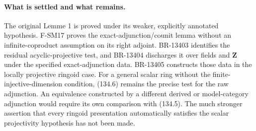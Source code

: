 \paragraph{What is settled and what remains.}
The original Lemme 1 is proved under its weaker, explicitly annotated
hypothesis.  F-SM17 proves the exact-adjunction/counit lemma without an
infinite-coproduct assumption on its right adjoint.  BR-13403 identifies
the residual acyclic-projective test, and BR-13404 discharges it over
fields and \(\mathbf Z\) under the specified exact-adjunction data.
BR-13405 constructs those data in the locally projective ringoid case.
For a general scalar ring without the finite-injective-dimension
condition, (134.6) remains the precise test for the raw adjunction.
An equivalence constructed by a different derived or model-category
adjunction would require its own comparison with (134.5).  The much
stronger assertion that every ringoid presentation automatically
satisfies the scalar projectivity hypothesis has not been made.

